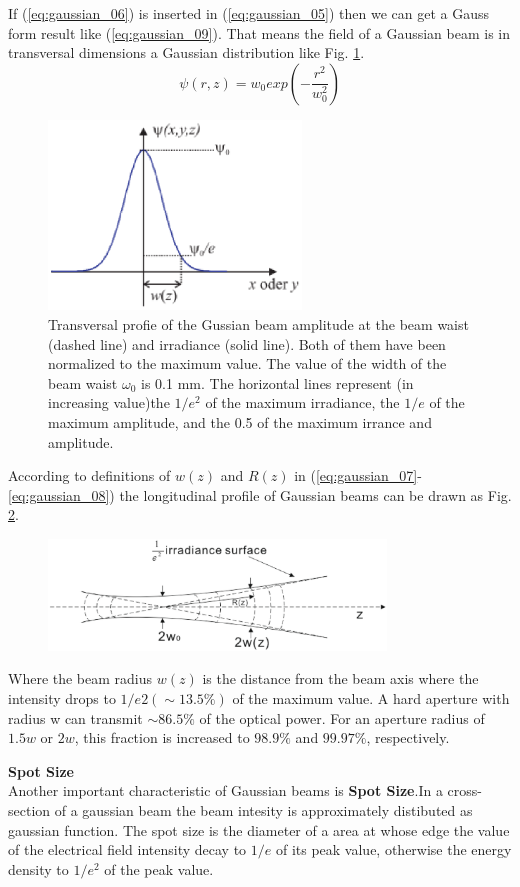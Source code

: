 If (\ref{eq:gaussian_06}) is inserted in (\ref{eq:gaussian_05}) then we can get a Gauss form result like (\ref{eq:gaussian_09}). That means the field of a Gaussian beam is in transversal dimensions a Gaussian distribution like Fig. \ref{fig:gaussian_verteilung}.
\begin{equation}
\psi(r,z)=w_{0}exp\left(-\frac{r^2}{w^2_{0}}\right)
\label{eq:gaussian_09}
\end{equation}
\begin{figure}[!ht]
\centering
\includegraphics[width=0.6\textwidth]{bilder/gussian_verteilung}
\caption{Transversal profie of the Gussian beam amplitude at the beam waist (dashed line) and irradiance (solid line). Both of them have been normalized to the maximum value. The value of the width of the beam waist $\omega_{0}$ is 0.1 mm. The horizontal lines represent  (in increasing value)the $1/e^{2}$ of the maximum irradiance, the $1/e$ of the maximum amplitude, and the 0.5 of the maximum irrance and amplitude.}
\label{fig:gaussian_verteilung}
\end{figure}

According to definitions of $w(z)$ and $R(z)$ in (\ref{eq:gaussian_07}-\ref{eq:gaussian_08}) the longitudinal profile of Gaussian beams can be drawn as Fig. \ref{fig:gussian_profile}.
\begin{figure}[!ht]
\centering
\includegraphics[width=0.8\textwidth]{bilder/gussian_profile}
\label{fig:gussian_profile}
\end{figure}
Where the beam radius $w(z)$ is the distance from the beam axis where the intensity drops to $1/e2 (\sim13.5\%)$ of the maximum value. A hard aperture with radius w can transmit $\sim86.5\%$ of the optical power. For an aperture radius of $1.5 w$ or $2 w$, this fraction is increased to $98.9\%$ and $99.97\%$, respectively.

\textbf{Spot Size}\\
Another important characteristic of Gaussian beams is \textbf{Spot Size}.In a cross-section of a gaussian beam the beam intesity is approximately distibuted as gaussian function. The spot size is the diameter of a area at whose edge the value of the electrical field intensity decay to $1/e$ of its peak value, otherwise the energy density to $1/e^2$ of the peak value.